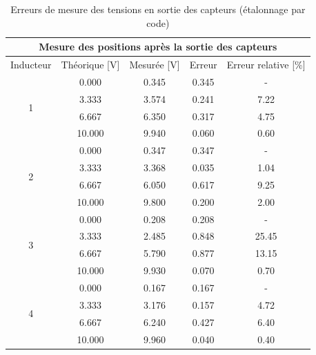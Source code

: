 \begin{table}[H]
    \centering
    \begin{tabular}{|c|c|c|c|c|}
        \hline
        \multicolumn{5}{|c|}{\textbf{Mesure des positions après la sortie des capteurs}}             \\ \hline
        Inducteur          & Théorique {[}V{]} & Mesurée {[}V{]} & Erreur & Erreur relative {[}\%{]} \\ \hline
        \multirow{4}{*}{1} & 0.000             & 0.345           & 0.345  & -                        \\ \cline{2-5}
                           & 3.333             & 3.574           & 0.241  & 7.22                     \\ \cline{2-5}
                           & 6.667             & 6.350           & 0.317  & 4.75                     \\ \cline{2-5}
                           & 10.000            & 9.940           & 0.060  & 0.60                     \\ \hline
        \multirow{4}{*}{2} & 0.000             & 0.347           & 0.347  & -                        \\ \cline{2-5}
                           & 3.333             & 3.368           & 0.035  & 1.04                     \\ \cline{2-5}
                           & 6.667             & 6.050           & 0.617  & 9.25                     \\ \cline{2-5}
                           & 10.000            & 9.800           & 0.200  & 2.00                     \\ \hline
        \multirow{4}{*}{3} & 0.000             & 0.208           & 0.208  & -                        \\ \cline{2-5}
                           & 3.333             & 2.485           & 0.848  & 25.45                    \\ \cline{2-5}
                           & 6.667             & 5.790           & 0.877  & 13.15                    \\ \cline{2-5}
                           & 10.000            & 9.930           & 0.070  & 0.70                     \\ \hline
        \multirow{4}{*}{4} & 0.000             & 0.167           & 0.167  & -                        \\ \cline{2-5}
                           & 3.333             & 3.176           & 0.157  & 4.72                     \\ \cline{2-5}
                           & 6.667             & 6.240           & 0.427  & 6.40                     \\ \cline{2-5}
                           & 10.000            & 9.960           & 0.040  & 0.40                     \\ \hline
    \end{tabular}
    \caption{Erreurs de mesure des tensions en sortie des capteurs (étalonnage par code)}
    \label{tab:premier_etalonnage_code_capteurs}
\end{table}

